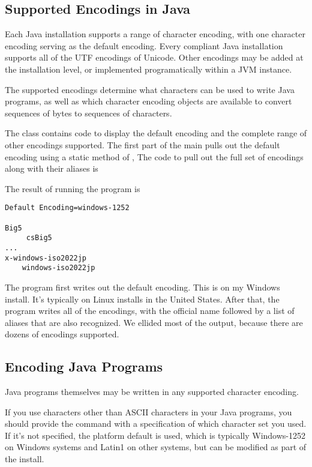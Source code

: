 \subsection{Supported Encodings in Java}

Each Java installation supports a range of character encoding, with
one character encoding serving as the default encoding.  Every
compliant Java installation supports all of the UTF encodings of
Unicode.  Other encodings may be added at the installation level, or
implemented programatically within a JVM instance.

The supported encodings determine what characters can be used to write
Java programs, as well as which character encoding objects are
available to convert sequences of bytes to sequences of characters.

The class  contains code to display the
default encoding and the complete range of other encodings supported.
The first part of the main pulls out the default encoding using
a static method of ,
%
%
The code to pull out the full set of encodings along with their
aliases is
%

The result of running the program is
%
\begin{verbatim}
Default Encoding=windows-1252

Big5
     csBig5
...
x-windows-iso2022jp
    windows-iso2022jp
\end{verbatim}
%
The program first writes out the default encoding.  This is
 on my Windows install.  It's typically
 on Linux installs in the United States.
After that, the program writes all of the encodings, with the official
name followed by a list of aliases that are also recognized.  We
ellided most of the output, because there are dozens of encodings
supported.

\subsection{Encoding Java Programs}

Java programs themselves may be written in any supported
character encoding.

If you use characters other than ASCII characters in your Java
programs, you should provide the  command with a
specification of which character set you used.  If it's not specified,
the platform default is used, which is typically Windows-1252 on
Windows systems and Latin1 on other systems, but can be modified as
part of the install.  

